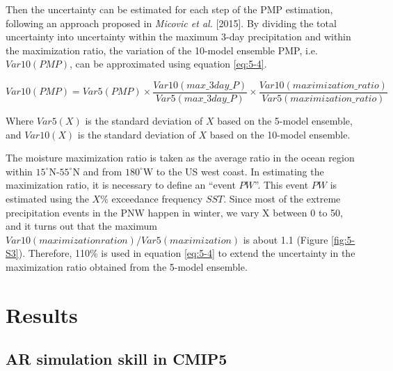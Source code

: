 Then the uncertainty can be estimated for each step of the PMP estimation, following an approach proposed in \textit{Micovic et al.} [2015]. By dividing the total uncertainty into uncertainty within the maximum 3-day precipitation and within the maximization ratio, the variation of the 10-model ensemble PMP, i.e. $Var10(PMP)$, can be approximated using equation \ref{eq:5-4}.

\begin{equation}
	Var10(PMP) = Var5(PMP) \times \frac{{Var10(max\_3day\_P)}}{{Var5(max\_3day\_P)}} \times \frac{{Var10(maximization\_ratio)}}{{Var5(maximization\_ratio)}}
	\label{eq:5-4}
\end{equation}

Where $Var5(X)$ is the standard deviation of $X$ based on the 5-model ensemble, and $Var10(X)$ is the standard deviation of $X$ based on the 10-model ensemble.

The moisture maximization ratio is taken as the average ratio in the ocean region within $15^{\circ}$N-$55^{\circ}$N and from $180^{\circ}$W to the US west coast. In estimating the maximization ratio, it is necessary to define an “event $PW$”. This event $PW$ is estimated using the $X\%$ exceedance frequency $SST$. Since most of the extreme precipitation events in the PNW happen in winter, we vary X between 0 to 50, and it turns out that the maximum $Var10(maximization ration)/Var5(maximization)$ is about 1.1 (Figure \ref{fig:5-S3}). Therefore, 110\% is used in equation \ref{eq:5-4} to extend the uncertainty in the maximization ratio obtained from the 5-model ensemble.

\section{Results}

\subsection{AR simulation skill in CMIP5}

